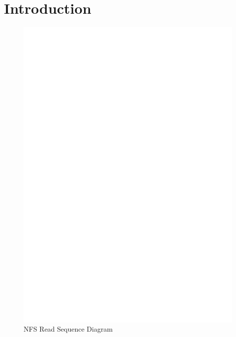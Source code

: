 \section{Introduction}
\label{sec:intro}

\begin{figure}
\centering
\includegraphics[scale=0.9]{figures/ReadSequence.eps}
\caption{NFS Read Sequence Diagram}
\label{fig:NFSRead}
\end{figure}
